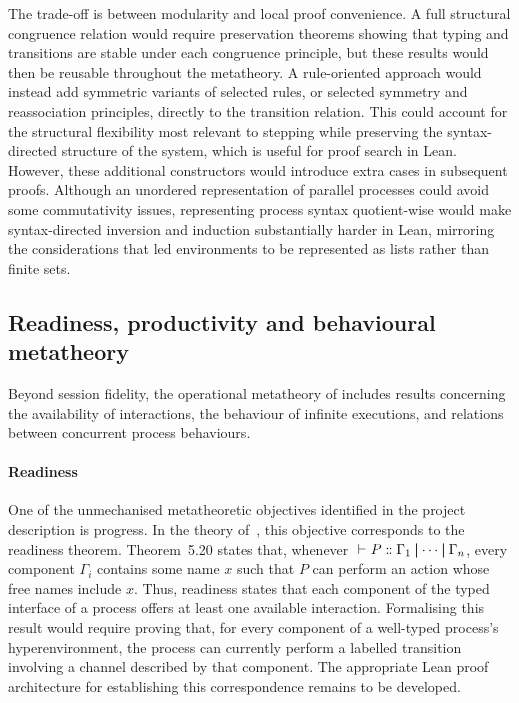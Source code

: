 The trade-off is between modularity and local proof convenience. A full structural congruence relation would require preservation theorems showing that typing and transitions are stable under each congruence principle, but these results would then be reusable throughout the metatheory. A rule-oriented approach would instead add symmetric variants of selected rules, or selected symmetry and reassociation principles, directly to the transition relation. This could account for the structural flexibility most relevant to stepping while preserving the syntax-directed structure of the system, which is useful for proof search in Lean. However, these additional constructors would introduce extra cases in subsequent proofs. Although an unordered representation of parallel processes could avoid some commutativity issues, representing process syntax quotient-wise would make syntax-directed inversion and induction substantially harder in Lean, mirroring the considerations that led environments to be represented as lists rather than finite sets.

\subsection{Readiness, productivity and behavioural metatheory}
Beyond session fidelity, the operational metatheory of \pill{} includes results concerning the availability of interactions, the behaviour of infinite executions, and relations between concurrent process behaviours.

\paragraph{Readiness} One of the unmechanised metatheoretic objectives identified in the project description is progress. In the theory of~\citet{abs-2106-11818}, this objective corresponds to the readiness theorem. Theorem~5.20 states that, whenever $\judge{}{P}{\Gamma_1 \pp \dots \pp \Gamma_n}$, every component $\Gamma_i$ contains some name $x$ such that $P$ can perform an action whose free names include $x$. Thus, readiness states that each component of the typed interface of a process offers at least one available interaction. Formalising this result would require proving that, for every component of a well-typed process's hyperenvironment, the process can currently perform a labelled transition involving a channel described by that component. The appropriate Lean proof architecture for establishing this correspondence remains to be developed.

